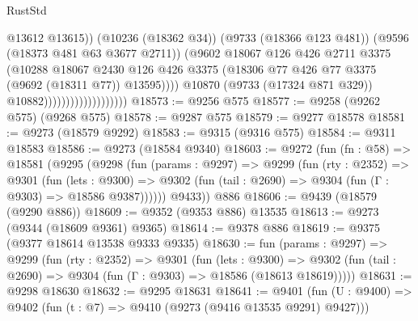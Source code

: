 \begin{lexlean}{RustStd}
\begin{coremodule}
                                                @13612
                                                @13615))
                                            (@10236 (@18362 @34))
                                            (@9733 (@18366 @123 @481))
                                            (@9596 (@18373 @481 @63 @3677 @2711))
                                            (@9602
                                              @18067
                                              @126
                                              @426
                                              @2711
                                              @3375
                                              (@10288
                                                @18067
                                                @2430
                                                @126
                                                @426
                                                @3375
                                                (@18306
                                                  @77
                                                  @426
                                                  @77
                                                  @3375
                                                  (@9692 (@18311 @77))
                                                  @13595))))
                                          @10870
                                          (@9733 (@17324 @871 @329))
                                          @10882)))))))))))))))))))
@18573 := @9256 @575
@18577 := @9258 (@9262 @575) (@9268 @575)
@18578 := @9287 @575
@18579 := @9277 @18578
@18581 := @9273 (@18579 @9292)
@18583 := @9315 (@9316 @575)
@18584 := @9311 @18583
@18586 := @9273 (@18584 @9340)
@18603 := @9272
    (fun (fn : @58) =>
    @18581
      (@9295
        (@9298
          (fun (params : @9297) =>
          @9299
            (fun (rty : @2352) =>
            @9301
              (fun (lets : @9300) =>
              @9302 (fun (tail : @2690) => @9304 (fun (Γ : @9303) => @18586 @9387))))))
        @9433))
    @886
@18606 := @9439 (@18579 (@9290 @886))
@18609 := @9352 (@9353 @886) @13535
@18613 := @9273 (@9344 (@18609 @9361) @9365)
@18614 := @9378 @886
@18619 := @9375 (@9377 @18614 @13538 @9333 @9335)
@18630 := fun (params : @9297) =>
  @9299
    (fun (rty : @2352) =>
    @9301
      (fun (lets : @9300) =>
      @9302 (fun (tail : @2690) => @9304 (fun (Γ : @9303) => @18586 (@18613 @18619)))))
@18631 := @9298 @18630
@18632 := @9295 @18631
@18641 := @9401
    (fun (U : @9400) => @9402 (fun (t : @7) => @9410 (@9273 (@9416 @13535 @9291) @9427)))

\end{coremodule}
\end{lexlean}
